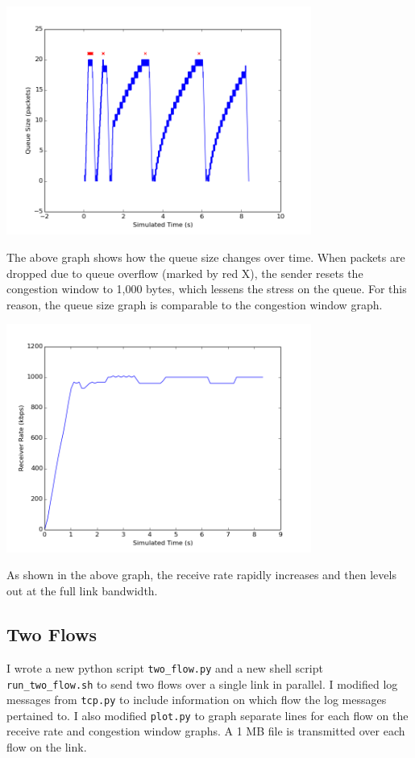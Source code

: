 \documentclass[11pt]{article}
\newcommand{\code}[1]{\texttt{#1}}
\begin{document}
\includegraphics[width=10cm]{../graphs/one_flow_queue_size.png}

The above graph shows how the queue size changes over time. When packets are dropped due to queue overflow (marked by red X), the sender resets the congestion window to 1,000 bytes, which lessens the stress on the queue. For this reason, the queue size graph is comparable to the congestion window graph.

\includegraphics[width=10cm]{../graphs/one_flow_receiver_rate.png}

As shown in the above graph, the receive rate rapidly increases and then levels out at the full link bandwidth.

\subsection{Two Flows}
I wrote a new python script \code{two\_flow.py} and a new shell script \code{run\_two\_flow.sh} to send two flows over a single link in parallel. I modified log messages from \code{tcp.py} to include information on which flow the log messages pertained to. I also modified \code{plot.py} to graph separate lines for each flow on the receive rate and congestion window graphs. A 1 MB file is transmitted over each flow on the link.
\end{document}
